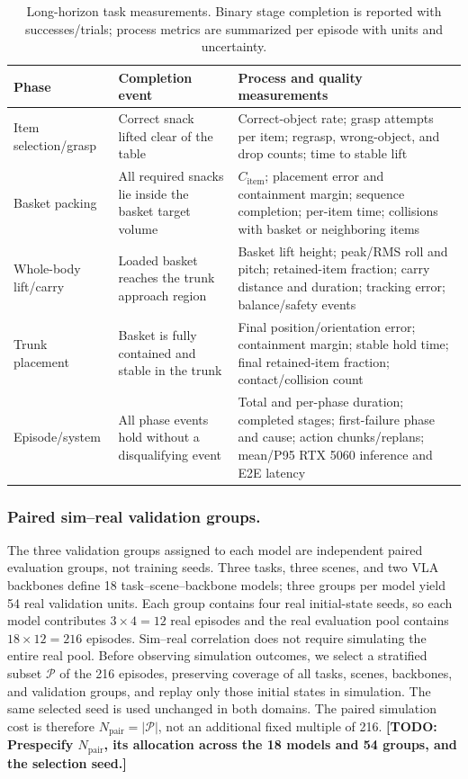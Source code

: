\documentclass[letterpaper,10pt,conference]{ieeeconf}
\newcommand{\todo}[1]{\textbf{[TODO: #1]}}
\begin{document}
\begin{table}[t]
  \caption{Long-horizon task measurements. Binary stage completion is reported
  with successes/trials; process metrics are summarized per episode with units
  and uncertainty.}
  \label{tab:task-metrics}
  \centering
  \small
  \begin{tabular}{p{}p{}p{}}
    \toprule
    Phase & Completion event & Process and quality measurements \\
    \midrule
    Item selection/grasp & Correct snack lifted clear of the table &
      Correct-object rate; grasp attempts per item; regrasp, wrong-object, and
      drop counts; time to stable lift \\
    Basket packing & All required snacks lie inside the basket target volume &
      $C_{\mathrm{item}}$; placement error and containment margin; sequence
      completion; per-item time; collisions with basket or neighboring items \\
    Whole-body lift/carry & Loaded basket reaches the trunk approach region &
      Basket lift height; peak/RMS roll and pitch; retained-item fraction;
      carry distance and duration; tracking error; balance/safety events \\
    Trunk placement & Basket is fully contained and stable in the trunk &
      Final position/orientation error; containment margin; stable hold time;
      final retained-item fraction; contact/collision count \\
    Episode/system & All phase events hold without a disqualifying event &
      Total and per-phase duration; completed stages; first-failure phase and
      cause; action chunks/replans; mean/P95 RTX 5060 inference and E2E latency \\
    \bottomrule
  \end{tabular}
\end{table}

\subsubsection{Paired sim--real validation groups.}
The three validation groups assigned to each model are independent paired
evaluation groups, not training seeds. Three tasks, three scenes, and two VLA
backbones define 18 task--scene--backbone models; three groups per model yield
54 real validation units. Each group contains four real initial-state seeds, so
each model contributes $3\times4=12$ real episodes and the real evaluation pool
contains $18\times12=216$ episodes. Sim--real correlation does not require
simulating the entire real pool. Before observing simulation outcomes, we select
a stratified subset $\mathcal{P}$ of the 216 episodes, preserving coverage of all
tasks, scenes, backbones, and validation groups, and replay only those initial
states in simulation. The same selected seed is used unchanged in both domains.
The paired simulation cost is therefore $N_{\mathrm{pair}}=|\mathcal{P}|$, not
an additional fixed multiple of 216. \todo{Prespecify $N_{\mathrm{pair}}$, its
allocation across the 18 models and 54 groups, and the selection seed.}
\end{document}
